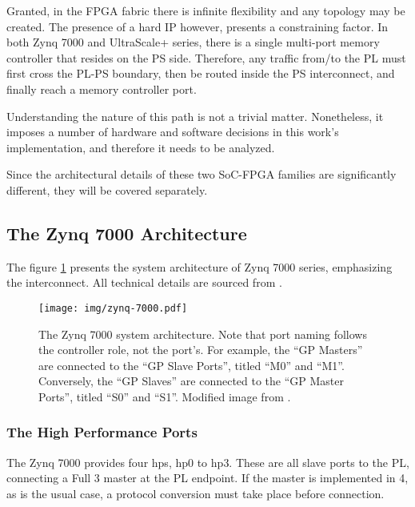 Granted, in the FPGA fabric there is infinite flexibility and any topology may be created.
The presence of a hard IP however, presents a constraining factor.
In both Zynq 7000 and UltraScale+ series, 
there is a single multi-port memory controller
that resides on the PS side. Therefore, any traffic from/to the PL must
first cross the PL-PS boundary, then be routed inside the PS interconnect,
and finally reach a memory controller port. 

Understanding the nature of this path is not a trivial matter. 
Nonetheless, it imposes a number of hardware and software decisions
in this work's implementation, and therefore it needs to be analyzed.

Since the architectural details of these two SoC-FPGA families are
significantly different, they will be covered separately.

\subsection{The Zynq 7000 Architecture}

The figure \ref{fig:zynq7000-block} presents the system architecture 
of Zynq 7000 series, emphasizing the interconnect. 
All technical details are sourced from \cite{ug585}.

\begin{figure}[htbp]
  \centering
  \captionsetup{justification=centering,margin=0cm}
  \texttt{[image: img/zynq-7000.pdf]}
  \caption{The Zynq 7000 system architecture. 
  Note that port naming follows the controller role, not the port's.
  For example, the ``GP  Masters'' are connected to the
  ``GP  Slave Ports'', titled ``M0'' and ``M1''. Conversely,
  the ``GP  Slaves'' are connected to the ``GP  Master Ports'', titled ``S0'' and ``S1''.
  Modified image from \cite{ug585}.
  }
  \label{fig:zynq7000-block}
\end{figure}

\subsubsection{The High Performance Ports}

The Zynq 7000 provides four \gls{hp}s, \gls{hp}0 to \gls{hp}3.
These are all  slave ports to the PL,
connecting a Full 3 master at the PL endpoint. 
If the  master is implemented in 4, as is the usual case,
a protocol conversion must take place before connection.

